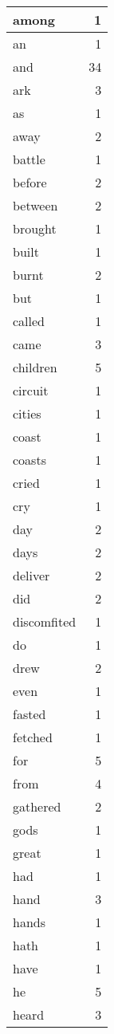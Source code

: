 \begin{center}
\begin{longtable}{l|r}
among & 1 \\ \hline
an & 1 \\ \hline
and & 34 \\ \hline
ark & 3 \\ \hline
as & 1 \\ \hline
away & 2 \\ \hline
battle & 1 \\ \hline
before & 2 \\ \hline
between & 2 \\ \hline
brought & 1 \\ \hline
built & 1 \\ \hline
burnt & 2 \\ \hline
but & 1 \\ \hline
called & 1 \\ \hline
came & 3 \\ \hline
children & 5 \\ \hline
circuit & 1 \\ \hline
cities & 1 \\ \hline
coast & 1 \\ \hline
coasts & 1 \\ \hline
cried & 1 \\ \hline
cry & 1 \\ \hline
day & 2 \\ \hline
days & 2 \\ \hline
deliver & 2 \\ \hline
did & 2 \\ \hline
discomfited & 1 \\ \hline
do & 1 \\ \hline
drew & 2 \\ \hline
even & 1 \\ \hline
fasted & 1 \\ \hline
fetched & 1 \\ \hline
for & 5 \\ \hline
from & 4 \\ \hline
gathered & 2 \\ \hline
gods & 1 \\ \hline
great & 1 \\ \hline
had & 1 \\ \hline
hand & 3 \\ \hline
hands & 1 \\ \hline
hath & 1 \\ \hline
have & 1 \\ \hline
he & 5 \\ \hline
heard & 3 \\ \hline

\end{longtable}
\end{center}

